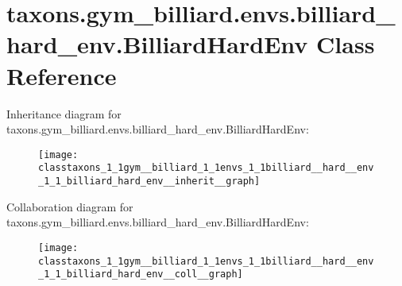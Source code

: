 \hypertarget{classtaxons_1_1gym__billiard_1_1envs_1_1billiard__hard__env_1_1_billiard_hard_env}{}\section{taxons.\+gym\+\_\+billiard.\+envs.\+billiard\+\_\+hard\+\_\+env.\+Billiard\+Hard\+Env Class Reference}
\label{classtaxons_1_1gym__billiard_1_1envs_1_1billiard__hard__env_1_1_billiard_hard_env}


Inheritance diagram for taxons.\+gym\+\_\+billiard.\+envs.\+billiard\+\_\+hard\+\_\+env.\+Billiard\+Hard\+Env\+:
\nopagebreak
\begin{figure}[H]
\begin{center}
\leavevmode
\texttt{[image: classtaxons\_1\_1gym\_\_billiard\_1\_1envs\_1\_1billiard\_\_hard\_\_env\_1\_1\_billiard\_hard\_env\_\_inherit\_\_graph]}
\end{center}
\end{figure}


Collaboration diagram for taxons.\+gym\+\_\+billiard.\+envs.\+billiard\+\_\+hard\+\_\+env.\+Billiard\+Hard\+Env\+:
\nopagebreak
\begin{figure}[H]
\begin{center}
\leavevmode
\texttt{[image: classtaxons\_1\_1gym\_\_billiard\_1\_1envs\_1\_1billiard\_\_hard\_\_env\_1\_1\_billiard\_hard\_env\_\_coll\_\_graph]}
\end{center}
\end{figure}
